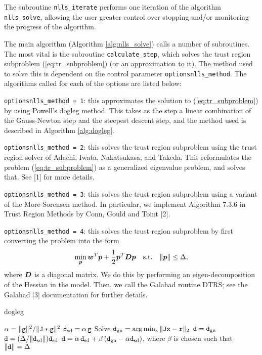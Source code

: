 The subroutine \texttt{nlls\_iterate} performs one iteration of the algorithm
\texttt{nlls\_solve}, allowing the user greater control over stopping and/or monitoring the progress of the algorithm.

The main algorithm (Algorithm \ref{alg:nlls_solve}) calls a number of subroutines.  
The most vital is the subroutine {\tt calculate\_step}, which solves the trust region 
subproblem (\ref{eq:tr_subproblem}) (or an approximation to it). The method used to solve
this is dependent on the control parameter {\tt options\ct nlls\_method}. The algorithms called for each of the options are listed below:
\begin{description}
\item {\tt options\ct nlls\_method = 1}: this approximates the solution to (\ref{eq:tr_subproblem}) by using Powell's dogleg method.  This takes as the step a linear combination of the Gauss-Newton step and the steepest descent step, and the method used is described in Algorithm \ref{alg:dogleg}.
\item {\tt options\ct nlls\_method = 2}: this solves the trust region subproblem using the trust region solver of  Adachi, Iwata, Nakatsukasa, and Takeda.  This reformulates the 
problem (\ref{eq:tr_subproblem}) as a generalized eigenvalue problem, and solves that.  See
[1] for more details.
\item {\tt options\ct nlls\_method = 3}: this solves the trust region subproblem using 
a variant of the More-Sorensen method.  In particular, we implement Algorithm 7.3.6
 in Trust Region Methods by Conn, Gould and Toint [2].
\item {\tt options\ct nlls\_method = 4}: this solves the trust region subproblem by first 
converting the problem into the form
$$\min_{\bm p} {\bm w}^T {\bm p} + \frac{1}{2} {\bm p}^T {\bm D} {\bm p} \quad {\rm s.t.} \quad \|{\bm p}\| \leq \Delta,$$
where ${\bm D}$ is a diagonal matrix.  We do this by performing an eigen-decomposition of 
the Hessian in the model.  Then, we call the {\sc Galahad} routine {\sc DTRS}; see 
the {\sc Galahad} [3] documentation for further details.
\end{description}

\begin{algorithm}
\caption{dogleg}
\label{alg:dogleg}
  \begin{algorithmic}[1]
     
        \State $\alpha = \|{\tt g}\|^2 / \|{\tt J} * {\tt g}\|^2$
        \State ${\tt d}_{\rm sd} = \alpha \,{\tt g}$
        \State Solve ${\tt d}_{\rm gn} = \arg \min_{{\tt x}}\|{\tt J} {\tt x}- {\tt r}\|_2$
        \State ${\tt d} = {\tt d}_{\rm gn}$
        \State ${\tt d} = (\Delta / \|{\tt d}_{\rm sd}\|) {\tt d}_{\rm sd}$
        \Else
        \State ${\tt d} = \alpha \, {\tt d}_{\rm sd} + \beta\, ({\tt d}_{\rm gn} - \alpha {\tt d}_{\rm sd})$, where $\beta$ is chosen such that $\|{\tt d}\| = \Delta$
        \EndIf
  \end{algorithmic}
\end{algorithm}


